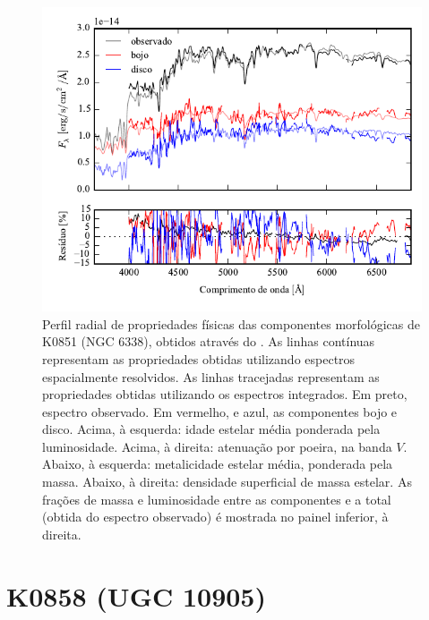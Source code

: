 \begin{figure}
	\includegraphics[page=14]{figuras/sample006a_synthesis}
	\caption[Propriedades físicas das componentes morfológicas de K0851 (NGC 6338)]
	{Perfil radial de propriedades físicas das componentes morfológicas de
	K0851 (NGC 6338), obtidos através do \starlight. As linhas contínuas
	representam as propriedades obtidas utilizando espectros espacialmente
	resolvidos. As linhas tracejadas representam as propriedades obtidas utilizando
	os espectros integrados. Em preto, espectro observado. Em vermelho, e azul, as
	componentes bojo e disco. Acima, à esquerda: idade estelar média ponderada pela
	luminosidade. Acima, à direita: atenuação por poeira, na banda $V$. Abaixo, à
	esquerda: metalicidade estelar média, ponderada pela massa. Abaixo, à direita:
	densidade superficial de massa estelar. As frações de massa e luminosidade
	entre as componentes e a total (obtida do espectro observado) é mostrada no
	painel inferior, à direita.}
	\label{fig:decompSinteseRadprof:K0851}
\end{figure}

\FloatBarrier


\section{K0858 (UGC 10905)}
\label{apendice:Decomp:K00858}

